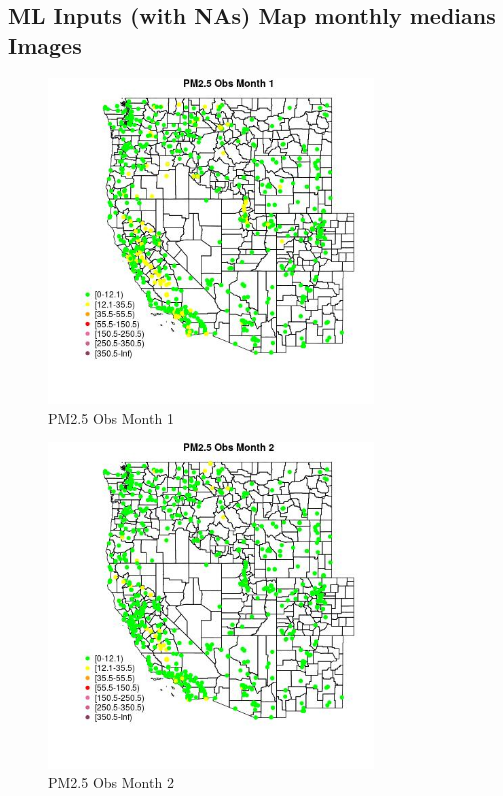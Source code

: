 
\subsection{ML Inputs (with NAs) Map monthly medians Images} 
 

\begin{figure} 
\centering  
\includegraphics[width=0.77\textwidth]{Code_Outputs/Report_ML_input_PM25_Step4_part_f_de_duplicated_aveswNAs_MapObsMo1PM25_Obs.jpg} 
\caption{\label{fig:Report_ML_input_PM25_Step4_part_f_de_duplicated_aveswNAsMapObsMo1PM25_Obs}PM2.5 Obs Month 1} 
\end{figure} 
 

\begin{figure} 
\centering  
\includegraphics[width=0.77\textwidth]{Code_Outputs/Report_ML_input_PM25_Step4_part_f_de_duplicated_aveswNAs_MapObsMo2PM25_Obs.jpg} 
\caption{\label{fig:Report_ML_input_PM25_Step4_part_f_de_duplicated_aveswNAsMapObsMo2PM25_Obs}PM2.5 Obs Month 2} 
\end{figure} 
 

